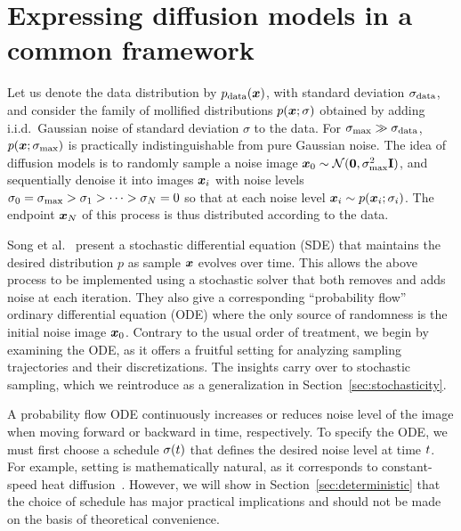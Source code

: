 \documentclass{article}
\begin{document}
\vspace*{-1mm}
\section{Expressing diffusion models in a common framework}

\label{sec:samplingbackground}

Let us denote the data distribution by $p_\text{data}(\boldsymbol{x})$, with standard deviation $\sigma_\text{data}$, and consider the family of mollified distributions $p(\boldsymbol{x}; \sigma)$ obtained by adding i.i.d.\ Gaussian noise of standard deviation $\sigma$ to the data.
For $\smax\gg\sdata$, $p(\xx; \smax)$ is practically indistinguishable from pure Gaussian noise. %
The idea of diffusion models is to randomly sample a noise image $\xx_0 \sim \mathcal{N}(\boldzero, \smax^2 \boldi)$,
and sequentially denoise it into images $\boldsymbol{x}_i$ with noise levels $\sigma_0 = \sigma_{\text{max}} > \sigma_1 > \dots > \sigma_N = 0$ so that
at each noise level $\boldsymbol{x}_i \sim p(\boldsymbol{x}_i; \sigma_i)$.
The endpoint $\boldsymbol{x}_N$ of this process is thus distributed according to the data.

Song et al.~\cite{Song2021sde} present a stochastic differential equation (SDE) that maintains the desired distribution $p$ as sample $\boldsymbol{x}$ evolves over time.
This allows the above process to be implemented using a stochastic solver that both removes and adds noise at each iteration.
They also give a corresponding ``probability flow'' ordinary differential equation (ODE) where the only source of randomness is the initial noise image $\boldsymbol{x}_0$.
Contrary to the usual order of treatment, we begin by examining the ODE, as it offers a fruitful setting for analyzing sampling trajectories and their discretizations. The insights carry over to stochastic sampling, which we reintroduce as a generalization in Section~\ref{sec:stochasticity}. %

\figDenoising

A probability flow ODE \cite{Song2021sde} continuously increases or reduces noise level of the image when moving forward or backward in time, respectively.
To specify the ODE, we must first choose a schedule $\sigma(t)$ that defines the desired noise level at time $t$.
For example, setting  is mathematically natural, as it corresponds to constant-speed heat diffusion~\cite{Fourier1822}. %
However, we will show in Section~\ref{sec:deterministic} that the choice of schedule has major practical implications and should not be made on the basis of theoretical convenience.
\end{document}
